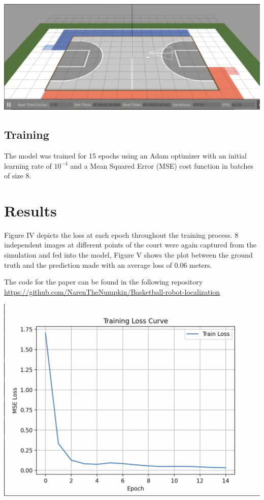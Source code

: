 \documentclass[a4paper]{article}
\begin{document}
\begin{multicols}{2}
{ \centering
 \includegraphics[scale=0.3]{results/gazebo.png}\\
 \label{pinki}
}

\subsection{Training}
\par \noindent
The model was trained for 15 epochs using an Adam optimizer \cite{kingma2014adam} with an initial learning rate of $10^{-4}$
and a Mean Squared Error (MSE) cost function in batches of size 8. 

\section{Results}
\par \noindent
Figure IV depicts the loss at each epoch throughout the training process.
8 independent images at different points of the court were again captured 
from the simulation and fed into the model, Figure V shows the plot between
the ground truth and the prediction made with an average loss of 0.06 meters.

\par \noindent 
The code for the paper can be found in the following repository
\href{https://github.com/NarenTheNumpkin/Basketball-robot-localization}{https://github.com/NarenTheNumpkin/Basketball-robot-localization}

{ \centering
 \includegraphics[scale=0.3]{results/loss-epochs.png}\\
 \label{pinki}
}


\end{multicols}
\end{document}
